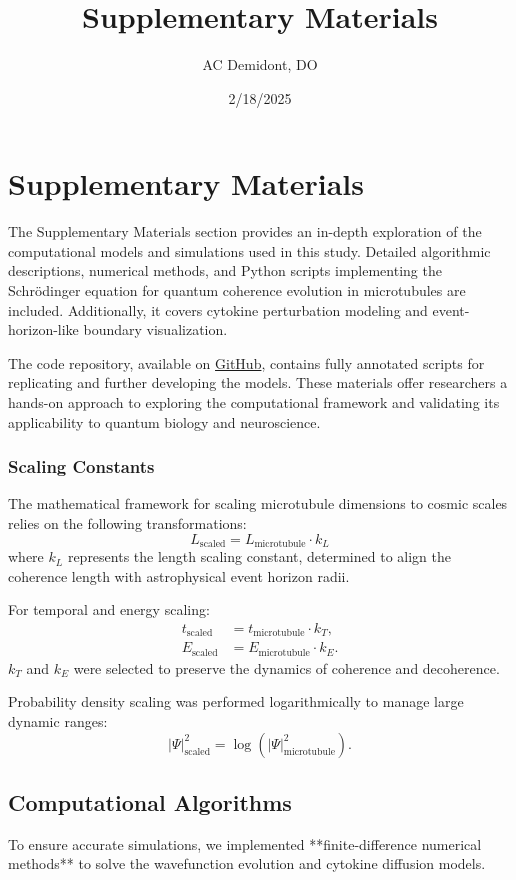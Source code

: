 \documentclass[12pt]{article}
\title{Supplementary Materials}
\author{AC Demidont, DO}
\date{2/18/2025}
\begin{document}
\maketitle
\section*{Supplementary Materials}
The Supplementary Materials section provides an in-depth exploration of the computational models and simulations used in this study. Detailed algorithmic descriptions, numerical methods, and Python scripts implementing the Schrödinger equation for quantum coherence evolution in microtubules are included. Additionally, it covers cytokine perturbation modeling and event-horizon-like boundary visualization.

The code repository, available on \href{https://github.com/TheonlyqueenAC/Microtubule_Simulation}{GitHub}, contains fully annotated scripts for replicating and further developing the models. These materials offer researchers a hands-on approach to exploring the computational framework and validating its applicability to quantum biology and neuroscience.
\subsubsection{Scaling Constants}
The mathematical framework for scaling microtubule dimensions to cosmic scales relies on the following transformations:
\[
L_{\text{scaled}} = L_{\text{microtubule}} \cdot k_L
\]
where \(k_L\) represents the length scaling constant, determined to align the coherence length with astrophysical event horizon radii.

For temporal and energy scaling:
\[
\begin{aligned}
t_{\text{scaled}} &= t_{\text{microtubule}} \cdot k_T, \\
E_{\text{scaled}} &= E_{\text{microtubule}} \cdot k_E.
\end{aligned}
\]
\(k_T\) and \(k_E\) were selected to preserve the dynamics of coherence and decoherence.

Probability density scaling was performed logarithmically to manage large dynamic ranges:
\[
|\Psi|^2_{\text{scaled}} = \log(|\Psi|^2_{\text{microtubule}}).
\]

\subsection*{Computational Algorithms}
To ensure accurate simulations, we implemented **finite-difference numerical methods** to solve the wavefunction evolution and cytokine diffusion models.
\end{document}

